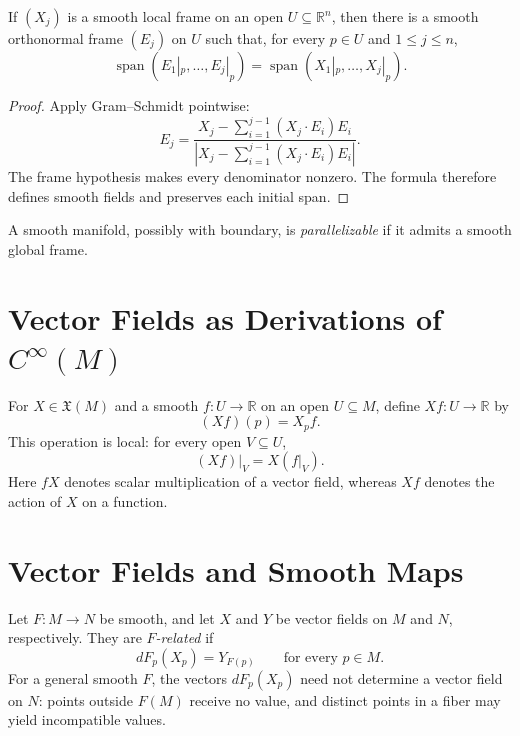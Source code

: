 \begin{lemma}
\label{lem:8-13}




If $(X_j)$ is a smooth local frame on an open $U\subseteq\mathbb{R}^n$, then
there is a smooth orthonormal frame $(E_j)$ on $U$ such that, for every
$p\in U$ and $1\leq j\leq n$,
\[
\operatorname{span}(E_1|_p,\ldots,E_j|_p)
=\operatorname{span}(X_1|_p,\ldots,X_j|_p).
\]
\end{lemma}

\begin{proof}

\sketch Apply Gram--Schmidt pointwise:
\[
E_j=\frac{X_j-\sum_{i=1}^{j-1}(X_j\cdot E_i)E_i}
{\left|X_j-\sum_{i=1}^{j-1}(X_j\cdot E_i)E_i\right|}.
\]
The frame hypothesis makes every denominator nonzero. The formula therefore
defines smooth fields and preserves each initial span.
\end{proof}

\begin{definition}
\label{def:8-55-extra-3}




A smooth manifold, possibly with boundary, is \emph{parallelizable} if it
admits a smooth global frame.
\end{definition}

\section{Vector Fields as Derivations of $C^\infty(M)$}

\begin{notation}
\label{not:8-56-extra-1}




For $X\in\mathfrak{X}(M)$ and a smooth $f\colon U\to\mathbb{R}$ on an open
$U\subseteq M$, define $Xf\colon U\to\mathbb{R}$ by
\[
(Xf)(p)=X_pf.
\]
This operation is local: for every open $V\subseteq U$,
\[
(Xf)|_V=X(f|_V). \tag{8.4}
\]
Here $fX$ denotes scalar multiplication of a vector field, whereas $Xf$
denotes the action of $X$ on a function.
\end{notation}

\section{Vector Fields and Smooth Maps}

\begin{definition}
\label{def:8-57-extra-1}




Let $F\colon M\to N$ be smooth, and let $X$ and $Y$ be vector fields on $M$
and $N$, respectively. They are \emph{$F$-related} if
\[
dF_p(X_p)=Y_{F(p)}
\qquad\text{for every }p\in M.
\]
For a general smooth $F$, the vectors $dF_p(X_p)$ need not determine a vector
field on $N$: points outside $F(M)$ receive no value, and distinct points in a
fiber may yield incompatible values.
\end{definition}

